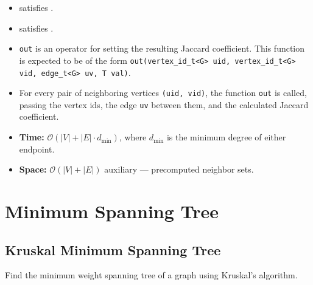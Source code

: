\begin{itemdescr}
      \pnum\mandates
            \begin{itemize}
                  \item {} satisfies .
                  \item {} satisfies .
            \end{itemize}
      \pnum\preconditions
            \begin{itemize}
                  \item 
                        \lstinline{out} is an operator for setting the resulting Jaccard coefficient. This function 
                        is expected to be of the form \lstinline{out(vertex_id_t<G> uid, vertex_id_t<G> vid, edge_t<G> uv, T val)}.
            \end{itemize}
      \pnum\effects 
            \begin{itemize}
                  \item
                        For every pair of neighboring vertices \lstinline{(uid, vid)}, the function \lstinline{out} is called, passing the vertex ids, 
                        the edge \lstinline{uv} between them, and the calculated Jaccard coefficient.
            \end{itemize}
      \pnum\complexity
            \begin{itemize}
                  \item \textbf{Time:} $\mathcal{O}(|V| + |E| \cdot d_{\min})$, where $d_{\min}$ is the minimum degree of either endpoint.
                  \item \textbf{Space:} $\mathcal{O}(|V|+|E|)$ auxiliary --- precomputed neighbor sets.
            \end{itemize}
\end{itemdescr}

\section{Minimum Spanning Tree}

\subsection{Kruskal Minimum Spanning Tree}
Find the minimum weight spanning tree of a graph using Kruskal's algorithm.

